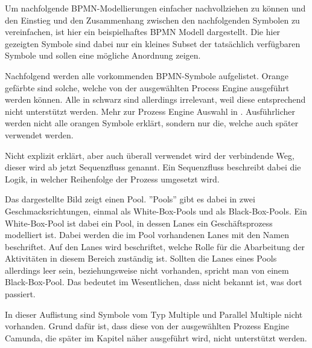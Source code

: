 

Um nachfolgende \ac{BPMN}-Modellierungen einfacher nachvollziehen zu können und den Einstieg und den Zusammenhang zwischen den nachfolgenden Symbolen zu vereinfachen, ist hier ein beispielhaftes \ac{BPMN} Modell dargestellt. Die hier gezeigten Symbole sind dabei nur ein kleines Subset der tatsächlich verfügbaren Symbole und sollen eine mögliche Anordnung zeigen. 

Nachfolgend werden alle vorkommenden \ac{BPMN}-Symbole aufgelistet. Orange gefärbte sind solche, welche von der ausgewählten Process Engine ausgeführt werden können. Alle in schwarz sind allerdings irrelevant, weil diese entsprechend nicht unterstützt werden. Mehr zur Prozess Engine Auswahl in . Ausführlicher werden nicht alle orangen Symbole erklärt, sondern nur die, welche auch später verwendet werden.

Nicht explizit erklärt, aber auch überall verwendet wird der verbindende Weg,  dieser wird ab jetzt Sequenzfluss genannt. Ein Sequenzfluss beschreibt dabei die Logik, in welcher Reihenfolge der Prozess umgesetzt wird. \citep[vgl.][S. 13]{bruce_englisch_2011} 

Das dargestellte Bild zeigt einen Pool. ''Pools'' gibt es dabei in zwei Geschmacksrichtungen, einmal als  White-Box-Pools und als Black-Box-Pools. Ein White-Box-Pool ist dabei ein Pool, in dessen Lanes ein Geschäftsprozess modelliert ist. Dabei werden die im Pool vorhandenen Lanes mit den Namen beschriftet. Auf den Lanes wird beschriftet, welche Rolle für die Abarbeitung der Aktivitäten in diesem Bereich zuständig ist. Sollten die Lanes eines Pools allerdings leer sein, beziehungsweise nicht vorhanden, spricht man von einem Black-Box-Pool. Das bedeutet im Wesentlichen, dass nicht bekannt ist, was dort passiert. \citep[vgl.][S. 55]{bruce_bpmn_2012}


In dieser Auflistung sind Symbole vom Typ Multiple und Parallel Multiple nicht vorhanden. Grund dafür ist, dass diese von der ausgewählten Prozess Engine Camunda, die später im Kapitel  näher ausgeführt wird, nicht unterstützt werden.

